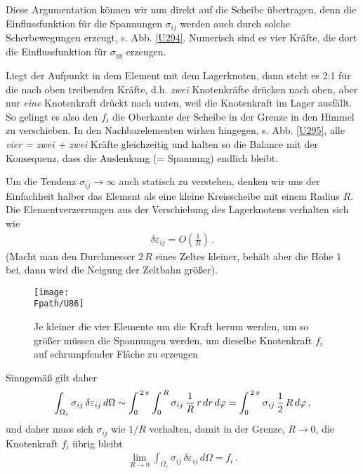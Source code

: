 {{{{{{Diese Argumentation k\"{o}nnen wir nun direkt auf die Scheibe \"{u}bertragen, denn die Einflussfunktion f\"{u}r die Spannungen $\sigma_{ij}$ werden auch durch solche Scherbewegungen erzeugt, s. Abb. \ref{U294}.  Numerisch sind es vier Kr\"{a}fte, die dort die Einflussfunktion f\"{u}r $\sigma_{yy}$ erzeugen.

Liegt der Aufpunkt in dem Element mit dem Lagerknoten, dann steht es 2:1 f\"{u}r die nach oben treibenden Kr\"{a}fte, d.h. {\em zwei\/} Knotenkr\"{a}fte dr\"{u}cken nach oben, aber nur {\em eine\/} Knotenkraft dr\"{u}ckt nach unten, weil die Knotenkraft im Lager ausf\"{a}llt. So gelingt es also den $f_i$ die Oberkante der Scheibe in der Grenze in \glq den Himmel\grq{} zu verschieben. In den Nachbarelementen wirken hingegen,  s. Abb. \ref{U295}, alle {\em vier = zwei + zwei\/} Kr\"{a}fte gleichzeitig und halten so die Balance mit der Konsequenz, dass die Auslenkung (= Spannung) endlich bleibt.

Um die Tendenz $\sigma_{ij} \to \infty$ auch statisch zu verstehen, denken wir uns der Einfachheit halber das Element als eine kleine Kreisscheibe mit einem Radius $R$. Die Elementverzerrungen aus der Verschiebung des Lagerknotens verhalten sich wie
\begin{align}
\delta \varepsilon_{ij} = O( \frac{1}{R})\,.
\end{align}
(Macht man den Durchmesser $2\,R$ eines Zeltes kleiner, beh\"{a}lt aber die H\"{o}he 1 bei, dann wird die Neigung der Zeltbahn gr\"{o}{\ss}er).
\begin{figure}
\centering
\if {} \sidecaption[t] \fi
{\texttt{[image: \\Fpath/U86]}}
\caption{Je kleiner die vier Elemente um die Kraft herum werden, um so gr\"{o}{\ss}er m\"{u}ssen die Spannungen werden, um dieselbe Knotenkraft $f_i$ auf schrumpfender Fl\"{a}che zu erzeugen}
\label{U86}%
\end{figure}%
Sinngem\"{a}{\ss} gilt daher
\begin{align}
 \int_{\Omega_e} \sigma_{ij}\,\delta \varepsilon_{ij}\,d\Omega \sim\int_0^{\,2\,\pi} \int_0^{\,R}   \sigma_{ij}\,\frac{1}{R}\,r\,dr\,d\varphi = \int_0^{\,2\,\pi} \sigma_{ij} \,\frac{1}{2}\,R\,d\varphi\,,
\end{align}
und daher muss sich $\sigma_{ij}$ wie $1/R$ verhalten, damit in der Grenze, $R \to 0$, die Knotenkraft $f_i$ \"{u}brig bleibt
\begin{align}
\lim_{R \to 0} \int_{\Omega_e} \sigma_{ij}\,\delta \varepsilon_{ij}\,d\Omega = f_i\,.
\end{align}

}}}}}}
